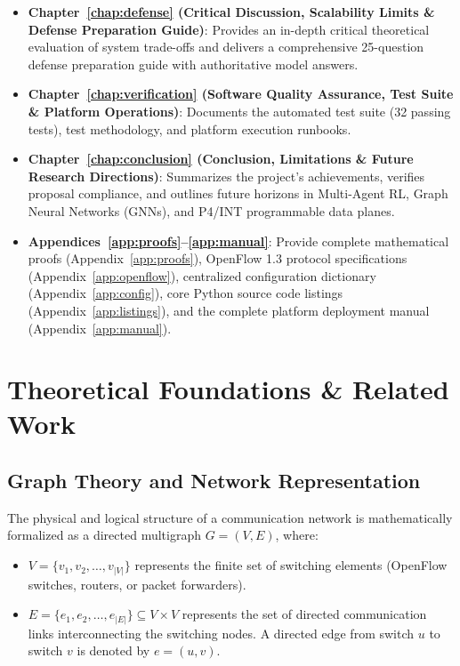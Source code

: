 \documentclass[12pt,a4paper,oneside]{report}
\begin{document}
\begin{itemize}
    \item \textbf{Chapter~\ref{chap:defense} (Critical Discussion, Scalability Limits \& Defense Preparation Guide)}: Provides an in-depth critical theoretical evaluation of system trade-offs and delivers a comprehensive 25-question defense preparation guide with authoritative model answers.
    \item \textbf{Chapter~\ref{chap:verification} (Software Quality Assurance, Test Suite \& Platform Operations)}: Documents the automated test suite (32 passing tests), test methodology, and platform execution runbooks.
    \item \textbf{Chapter~\ref{chap:conclusion} (Conclusion, Limitations \& Future Research Directions)}: Summarizes the project's achievements, verifies proposal compliance, and outlines future horizons in Multi-Agent RL, Graph Neural Networks (GNNs), and P4/INT programmable data planes.
    \item \textbf{Appendices~\ref{app:proofs}--\ref{app:manual}}: Provide complete mathematical proofs (Appendix~\ref{app:proofs}), OpenFlow 1.3 protocol specifications (Appendix~\ref{app:openflow}), centralized configuration dictionary (Appendix~\ref{app:config}), core Python source code listings (Appendix~\ref{app:listings}), and the complete platform deployment manual (Appendix~\ref{app:manual}).
\end{itemize}


\chapter{Theoretical Foundations \& Related Work}
\label{chap:theory}

\section{Graph Theory and Network Representation}
The physical and logical structure of a communication network is mathematically formalized as a directed multigraph $G = (V, E)$, where:
\begin{itemize}
    \item $V = \{v_1, v_2, \dots, v_{|V|}\}$ represents the finite set of switching elements (OpenFlow switches, routers, or packet forwarders).
    \item $E = \{e_1, e_2, \dots, e_{|E|}\} \subseteq V \times V$ represents the set of directed communication links interconnecting the switching nodes. A directed edge from switch $u$ to switch $v$ is denoted by $e = (u, v)$.
\end{itemize}
\end{document}
